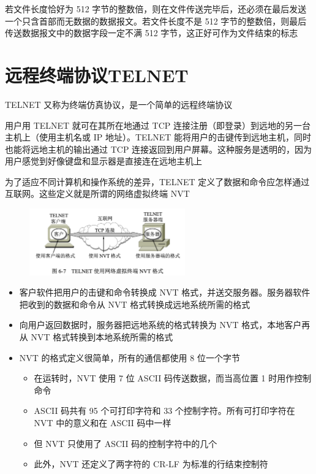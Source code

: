 \documentclass[cs4size,a4paper,10pt]{ctexart}
\begin{document}
	若文件长度恰好为 512 字节的整数倍，则在文件传送完毕后，还必须在最后发送一个只含首部而无数据的数据报文。若文件长度不是 512 字节的整数倍，则最后传送数据报文中的数据字段一定不满 512 字节，这正好可作为文件结束的标志

	\section{远程终端协议TELNET}

	TELNET 又称为终端仿真协议，是一个简单的远程终端协议

	用户用 TELNET 就可在其所在地通过 TCP 连接注册（即登录）到远地的另一台主机上（使用主机名或 IP 地址）。TELNET 能将用户的击键传到远地主机，同时也能将远地主机的输出通过 TCP 连接返回到用户屏幕。这种服务是透明的，因为用户感觉到好像键盘和显示器是直接连在远地主机上

	为了适应不同计算机和操作系统的差异，TELNET 定义了数据和命令应怎样通过互联网。这些定义就是所谓的网络虚拟终端 NVT 

	\begin{figure}[H]
		\centering
		\includegraphics[width=0.6\textwidth]{img/6.7}
	\end{figure}

	\begin{itemize}
		\item 客户软件把用户的击键和命令转换成 NVT 格式，并送交服务器。服务器软件把收到的数据和命令从 NVT 格式转换成远地系统所需的格式
		\item 向用户返回数据时，服务器把远地系统的格式转换为 NVT 格式，本地客户再从 NVT 格式转换到本地系统所需的格式
		\item NVT 的格式定义很简单，所有的通信都使用 8 位一个字节
		\begin{itemize}
			\item 在运转时，NVT 使用 7 位 ASCII 码传送数据，而当高位置 1 时用作控制命令
			\item ASCII 码共有 95 个可打印字符和 33 个控制字符。所有可打印字符在 NVT 中的意义和在 ASCII 码中一样
			\item 但 NVT 只使用了 ASCII 码的控制字符中的几个
			\item 此外，NVT 还定义了两字符的 CR-LF 为标准的行结束控制符
		\end{itemize}
	\end{itemize}
\end{document}
